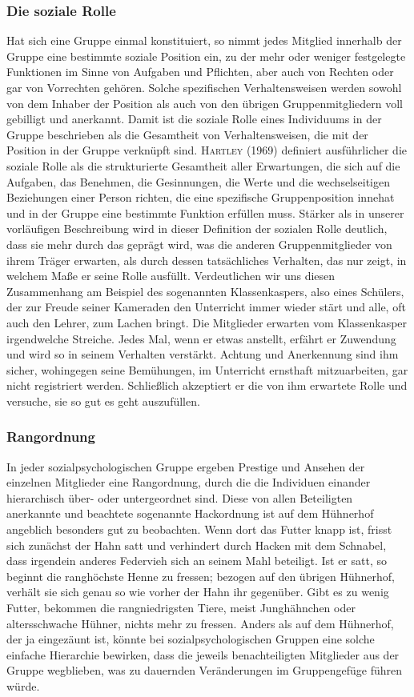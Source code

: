 \documentclass[12pt]{scrartcl}
\begin{document}
\subsubsection{Die soziale Rolle}
Hat sich eine Gruppe einmal konstituiert, so nimmt jedes Mitglied innerhalb der
Gruppe eine bestimmte soziale Position ein, zu der mehr oder weniger
festgelegte Funktionen im Sinne von Aufgaben und Pflichten, aber auch von
Rechten oder gar von Vorrechten gehören. Solche spezifischen Verhaltensweisen
werden sowohl von dem Inhaber der Position als auch von den übrigen
Gruppenmitgliedern voll gebilligt und anerkannt. Damit ist die soziale Rolle
eines Individuums in der Gruppe beschrieben als die Gesamtheit von
Verhaltensweisen, die mit der Position in der Gruppe verknüpft sind.
\textsc{Hartley} (1969) definiert ausführlicher die soziale Rolle als die
strukturierte Gesamtheit aller Erwartungen, die sich auf die Aufgaben, das
Benehmen, die Gesinnungen, die Werte und die wechselseitigen Beziehungen einer
Person richten, die eine spezifische Gruppenposition innehat und in der Gruppe
eine bestimmte Funktion erfüllen muss. Stärker als in unserer vorläufigen
Beschreibung wird in dieser Definition der sozialen Rolle deutlich, dass sie
mehr durch das geprägt wird, was die anderen Gruppenmitglieder von ihrem Träger
erwarten, als durch dessen tatsächliches Verhalten, das nur zeigt, in welchem
Maße er seine Rolle ausfüllt. Verdeutlichen wir uns diesen Zusammenhang am
Beispiel des sogenannten Klassenkaspers, also eines Schülers, der zur Freude
seiner Kameraden den Unterricht immer wieder stärt und alle, oft auch den
Lehrer, zum Lachen bringt. Die Mitglieder erwarten vom Klassenkasper
irgendwelche Streiche. Jedes Mal, wenn er etwas anstellt, erfährt er Zuwendung
und wird so in seinem Verhalten verstärkt. Achtung und Anerkennung sind ihm
sicher, wohingegen seine Bemühungen, im Unterricht ernsthaft mitzuarbeiten, gar
nicht registriert werden. Schließlich akzeptiert er die von ihm erwartete Rolle
und versuche, sie so gut es geht auszufüllen.

\subsubsection{Rangordnung}
In jeder sozialpsychologischen Gruppe ergeben Prestige und Ansehen der
einzelnen Mitglieder eine Rangordnung, durch die die Individuen einander
hierarchisch über- oder untergeordnet sind. Diese von allen Beteiligten
anerkannte und beachtete sogenannte Hackordnung ist auf dem Hühnerhof angeblich
besonders gut zu beobachten. Wenn dort das Futter knapp ist, frisst sich
zunächst der Hahn satt und verhindert durch Hacken mit dem Schnabel, dass
irgendein anderes Federvieh sich an seinem Mahl beteiligt. Ist er satt, so
beginnt die ranghöchste Henne zu fressen; bezogen auf den übrigen Hühnerhof,
verhält sie sich genau so wie vorher der Hahn ihr gegenüber. Gibt es zu wenig
Futter, bekommen die rangniedrigsten Tiere, meist Junghähnchen oder
altersschwache Hühner, nichts mehr zu fressen. Anders als auf dem Hühnerhof,
der ja eingezäunt ist, könnte bei sozialpsychologischen Gruppen eine solche
einfache Hierarchie bewirken, dass die jeweils benachteiligten Mitglieder aus
der Gruppe wegblieben, was zu dauernden Veränderungen im Gruppengefüge führen
würde.
\end{document}

